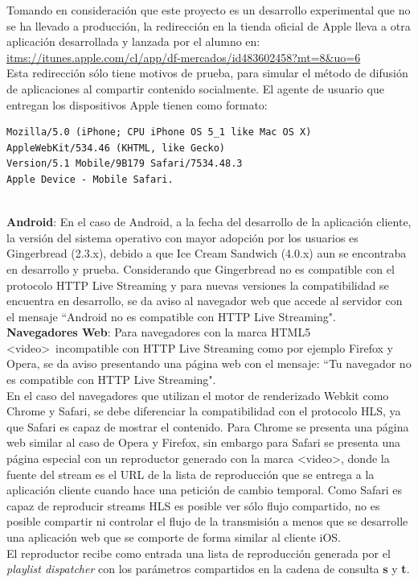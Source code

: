 Tomando en consideración que este proyecto es un desarrollo experimental que no se ha llevado a producción, la redirección en la tienda oficial de Apple lleva a otra aplicación desarrollada y lanzada por el alumno en: \url{itms://itunes.apple.com/cl/app/df-mercados/id483602458?mt=8\&uo=6} \\

Esta redirección sólo tiene motivos de prueba, para simular el método de difusión de aplicaciones al compartir contenido socialmente.
El agente de usuario que entregan los dispositivos Apple tienen como formato: 
	\begin {lstlisting}
Mozilla/5.0 (iPhone; CPU iPhone OS 5_1 like Mac OS X) 
AppleWebKit/534.46 (KHTML, like Gecko) 
Version/5.1 Mobile/9B179 Safari/7534.48.3
Apple Device - Mobile Safari.
\end{lstlisting} 
~\\ %

\textbf{Android}: En el caso de Android, a la fecha del desarrollo de la aplicación cliente, la versión del sistema operativo con mayor adopción por los usuarios es Gingerbread (2.3.x), debido a que Ice Cream Sandwich (4.0.x) aun se encontraba en desarrollo y prueba. Considerando que Gingerbread no es compatible con el protocolo HTTP Live Streaming y para nuevas versiones la compatibilidad se encuentra en desarrollo, se da aviso al navegador web que accede al servidor con el mensaje \textquotedblleft Android no es compatible con HTTP Live Streaming".\\

\textbf{Navegadores Web}:
Para navegadores con la marca HTML5 \textless video\textgreater \ incompatible con HTTP Live Streaming como por ejemplo Firefox y Opera, se da aviso presentando una página web con el mensaje: \textquotedblleft Tu navegador no es compatible con HTTP Live Streaming". \\

En el caso del navegadores que utilizan el motor de renderizado Webkit como Chrome y Safari, se debe diferenciar la compatibilidad con el protocolo HLS, ya que Safari es capaz de mostrar el contenido. Para Chrome se presenta una página web similar al caso de Opera y Firefox, sin embargo para Safari se presenta una página especial con un reproductor generado con la marca \textless video\textgreater , donde la fuente del stream es el URL de la lista de reproducción que se entrega a la aplicación cliente cuando hace una petición de cambio temporal. Como Safari es capaz de reproducir streams HLS es posible ver sólo flujo compartido, no es posible compartir ni controlar el flujo de la transmisión a menos que se desarrolle una aplicación web que se comporte de forma similar al cliente iOS.\\

El reproductor recibe como entrada una lista de reproducción generada por el \textit{playlist dispatcher} con los parámetros compartidos en la cadena de consulta \textbf{s} y \textbf{t}.



		
		